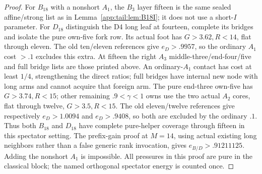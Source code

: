 \begin{proof}
For $B_{18}$ with a nonshort $A_1$, the $B_3$ layer fifteen
is the same sealed affine/strong list as in
Lemma~\ref{app:tail:lem:B18I}; it does not use a short-$I$
parameter. For $D_{18}$ distinguish the D4 long leaf at
fourteen, complete its bridges and isolate the pure own-five
fork row. Its actual foot has $G>3.62,R<14$, flat through
eleven. The old ten/eleven references give $e_D>.9957$,
so the ordinary $A_1$ cost $>.1$ excludes this extra.
At fifteen the right $A_3$ middle-three/end-four/five and
full bridge lists are those printed above. An ordinary-$A_1$
contact has cost at least $1/4$, strengthening the direct
ratios; full bridges have internal new node with long arms
and cannot acquire that foreign arm.
The pure end-three own-five has $G>3.74,R<15$; other
remaining $.9<\gamma<1$ owns use the two actual $A_2$
cores, flat through twelve, $G>3.5,R<15$.
The old eleven/twelve references give respectively $e_D>1.0094$
and $e_D>.9408$, so both are excluded by the ordinary $.1$.
Thus both $B_{18}$ and $D_{18}$ have complete pure-helper
coverage through fifteen in this spectator setting.
The prefix-gain proof at $M=14$, using actual existing long
neighbors rather than a false generic rank invocation, gives
$e_{B/D}>.91211125$. Adding the nonshort $A_1$ is impossible.
All pressures in this proof are pure in the classical block;
the named orthogonal spectator energy is counted once.
\end{proof}

